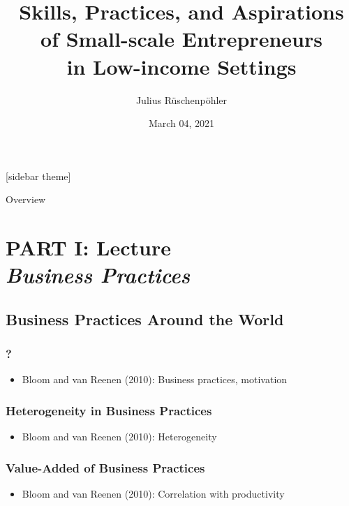 \documentclass[10pt]{beamer}
\title[Skills, Practices, and Aspirations of Small Firms in LMICs]{Skills, Practices, and Aspirations \\ of Small-scale Entrepreneurs \\ in Low-income Settings}
\author[R{\"u}schenp{\"o}hler]{Julius R{\"u}schenp{\"o}hler\inst{*}}
\institute[]{\inst{*} UC Berkeley, CEGA}
\date{March 04, 2021}
\begin{document}

\begin{frame}
\titlepage
\end{frame}


[sidebar theme]


\AtBeginSection
{\begin{frame}{Overview}
\end{frame}}



\section{\textbf{PART I: Lecture} \\ \quad \emph{Business Practices}}

\subsection{Business Practices Around the World}

\begin{frame}
\frametitle{?}
	\begin{itemize}
	\item Bloom and van Reenen (2010): Business practices, motivation
	\vspace{0.2in}
	\end{itemize}
\end{frame}

\begin{frame}
\frametitle{Heterogeneity in Business Practices}
	\begin{itemize}
	\item Bloom and van Reenen (2010): Heterogeneity
	\vspace{0.2in}
	\end{itemize}
\end{frame}

\begin{frame}
\frametitle{Value-Added of Business Practices}
	\begin{itemize}
	\item Bloom and van Reenen (2010): Correlation with productivity
	\vspace{0.2in}
	\end{itemize}
\end{frame}
\end{document}
